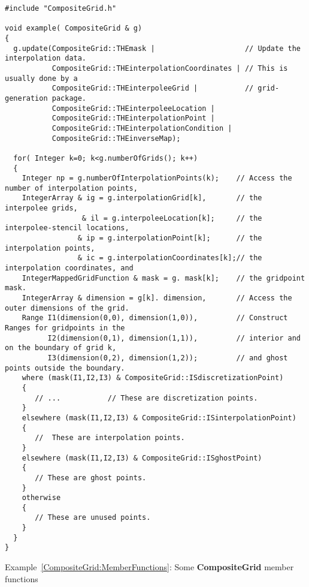 \documentclass{article}
\begin{document}
\small
\begin{verbatim}
#include "CompositeGrid.h"

void example( CompositeGrid & g) 
{                                        
  g.update(CompositeGrid::THEmask |                     // Update the interpolation data.  
           CompositeGrid::THEinterpolationCoordinates | // This is usually done by a
           CompositeGrid::THEinterpoleeGrid |           // grid-generation package.  
           CompositeGrid::THEinterpoleeLocation | 
           CompositeGrid::THEinterpolationPoint |   
           CompositeGrid::THEinterpolationCondition | 
           CompositeGrid::THEinverseMap);   

  for( Integer k=0; k<g.numberOfGrids(); k++) 
  {                                                       
    Integer np = g.numberOfInterpolationPoints(k);    // Access the number of interpolation points,             
    IntegerArray & ig = g.interpolationGrid[k],       // the interpolee grids, 
                  & il = g.interpoleeLocation[k];     // the interpolee-stencil locations, 
                 & ip = g.interpolationPoint[k];      // the interpolation points,    
                 & ic = g.interpolationCoordinates[k];// the interpolation coordinates, and   
    IntegerMappedGridFunction & mask = g. mask[k];    // the gridpoint mask.
    IntegerArray & dimension = g[k]. dimension,       // Access the outer dimensions of the grid.               
    Range I1(dimension(0,0), dimension(1,0)),         // Construct  Ranges for gridpoints in the
          I2(dimension(0,1), dimension(1,1)),         // interior and on the boundary of grid k,                
          I3(dimension(0,2), dimension(1,2));         // and ghost points outside the boundary.                 
    where (mask(I1,I2,I3) & CompositeGrid::ISdiscretizationPoint) 
    {                                                                                              
       // ...           // These are discretization points.                       
    }
    elsewhere (mask(I1,I2,I3) & CompositeGrid::ISinterpolationPoint) 
    {                                                                                               
       //  These are interpolation points.                        
    }
    elsewhere (mask(I1,I2,I3) & CompositeGrid::ISghostPoint)
    {
       // These are ghost points.                                
    }  
    otherwise
    {
       // These are unused points.                               
    } 
  } 
}
\end{verbatim}
{\center Example~\ref{CompositeGrid:MemberFunctions}: Some \textbf{CompositeGrid} member functions\label{CompositeGrid:MemberFunctions}}
\end{document}
